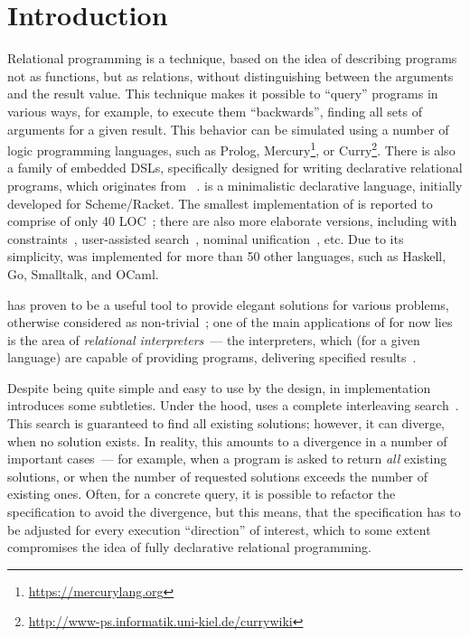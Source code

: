 \section{Introduction}

Relational programming is a technique, based on the idea of describing programs not as functions, but 
as relations, without distinguishing between the arguments and the result value. This technique makes it 
possible to ``query'' programs in various ways, for example, to execute them ``backwards'', finding
all sets of arguments for a given result. This behavior can be simulated using a number of
logic programming languages, such as Prolog, Mercury\footnote{\url{https://mercurylang.org}}, 
or Curry\footnote{\url{http://www-ps.informatik.uni-kiel.de/currywiki}}. 
There is also a family of embedded DSLs, specifically designed for writing declarative relational
programs, which originates from \miniKanren~\cite{TRS}. \miniKanren is a minimalistic 
declarative language, initially developed for Scheme/Racket. The smallest implementation of \miniKanren 
is reported to comprise of only 40 LOC~\cite{MicroKanren,2016}; there are also more elaborate versions, including
\miniKanren with constraints~\cite{CKanren,CKanren1}, user-assisted search~\cite{Guided}, nominal unification~\cite{AlphaKanren},
etc. Due to its simplicity, \miniKanren was implemented for more than 50 other languages, such as
Haskell, Go, Smalltalk, and OCaml.

\miniKanren has proven to be a useful tool to provide elegant solutions for various problems, otherwise considered as non-trivial~\cite{WillThesis};
one of the main applications of \miniKanren for now lies is the area of \emph{relational interpreters}~--- the interpreters, which (for a given language)
are capable of providing programs, delivering specified results~\cite{Untagged}.

Despite being quite simple and easy to use by the design, in implementation \miniKanren introduces some subtleties. Under the hood, \miniKanren 
uses a complete interleaving search~\cite{Search}. This search is guaranteed to find all existing solutions; however, it can diverge, when no 
solution exists. In reality, this amounts to a divergence in a number of important cases~--- for example, when a program is asked to 
return \emph{all} existing solutions, or when the number of requested solutions exceeds the number of existing ones. Often, for a 
concrete query, it is possible to refactor the specification to avoid the divergence, but this means, that the specification has to be adjusted for every 
execution ``direction'' of interest, which to some extent compromises the idea of fully declarative relational programming. 

